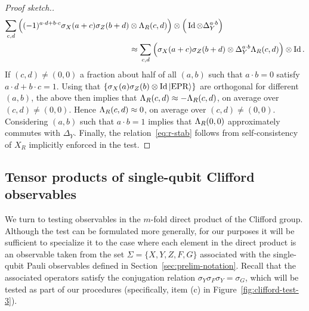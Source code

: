 \begin{proof}[Proof sketch.]
\begin{align*}
\sum_{c,d} \Big((-1)^{a\cdot d  +b\cdot c}\sigma_X(a+c)\sigma_Z(b+d) &\otimes \Lambda_R(c,d)\Big) \otimes \Big(\mathop{\rm Id}\nolimits \otimes \Delta_Y^{a\cdot b}\Big)\\
& \approx \sum_{c,d} \Big( \sigma_X(a+c)\sigma_Z(b+d) \otimes \Delta_Y^{a\cdot b } \Lambda_R(c,d)\Big) \otimes \mathop{\rm Id}\nolimits .
\end{align*}
If $(c,d)\neq (0,0)$ a fraction about half of all $(a,b)$ such that $a\cdot b = 0$ satisfy $a\cdot d + b\cdot c = 1$. Using that $\{\sigma_X(a)\sigma_Z(b) \otimes \mathop{\rm Id}\nolimits |{\rm EPR}\rangle\}$ are orthogonal for different $(a,b)$, the above then implies that $\Lambda_R(c,d)\approx -\Lambda_R(c,d)$, on average over $(c,d)\neq (0,0)$. Hence $\Lambda_R(c,d)\approx 0$, on average over $(c,d)\neq (0,0)$. 
Considering $(a,b)$ such that $a\cdot b=1$ implies that $\Lambda_R(0,0)$ approximately commutes with $\Delta_Y$. Finally, the relation~\eqref{eq:r-stab} follows from self-consistency of $X_R$ implicitly enforced in the test.
\end{proof}

\subsection{Tensor products of single-qubit Clifford observables}
\label{sec:n-2-clifford}

We turn to testing observables in the $m$-fold direct product of the Clifford group. Although the test can be formulated more generally, for our purposes it will be sufficient to specialize it to the case where each element in the direct product is an observable taken from the set  $\Sigma = \{X,Y,Z,F,G\}$ associated with the single-qubit Pauli observables defined in Section~\ref{sec:prelim-notation}. Recall that the associated operators satisfy the conjugation relation $\sigma_Y \sigma_F \sigma_Y = \sigma_G$, which will be tested as part of our procedures (specifically, item (c) in Figure~\ref{fig:clifford-test-3}).


